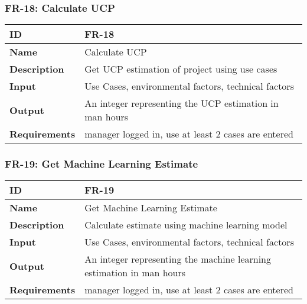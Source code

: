 \subsubsection{FR-18: Calculate UCP}
\begin{center}
  \begin{tabularx}{\textwidth}{|l|X|}
      \hline
      \textbf{ID} & FR-18 \\
      \hline
      \textbf{Name} & Calculate UCP \\
      \hline
      \textbf{Description} & Get UCP estimation of project using use cases \\
      \hline
      \textbf{Input} & Use Cases, environmental factors, technical factors \\
      \hline
      \textbf{Output} & An integer representing the UCP estimation in man hours \\
      \hline
      \textbf{Requirements} & manager logged in, use at least 2 cases are entered \\
      \hline
  \end{tabularx}
\end{center}

\subsubsection{FR-19: Get Machine Learning Estimate}
\begin{center}
  \begin{tabularx}{\textwidth}{|l|X|}
      \hline
      \textbf{ID} & FR-19 \\
      \hline
      \textbf{Name} & Get Machine Learning Estimate \\
      \hline
      \textbf{Description} & Calculate estimate using machine learning model \\
      \hline
      \textbf{Input} & Use Cases, environmental factors, technical factors \\
      \hline
      \textbf{Output} & An integer representing the machine learning estimation in man hours \\
      \hline
      \textbf{Requirements} & manager logged in, use at least 2 cases are entered \\
      \hline
  \end{tabularx}
\end{center}


